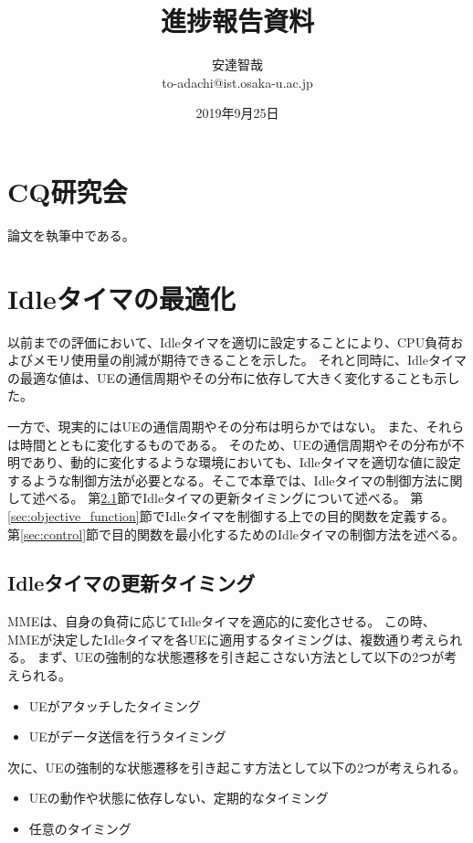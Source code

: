 \documentclass[a4j]{ujarticle}
\title{進捗報告資料}
\author{安達智哉\\to-adachi@ist.osaka-u.ac.jp}
\date{2019年9月25日}
\begin{document}
\maketitle

\section{CQ研究会}
論文を執筆中である。


\section{Idleタイマの最適化}
以前までの評価において、Idleタイマを適切に設定することにより、CPU負荷およびメモリ使用量の削減が期待できることを示した。
それと同時に、Idleタイマの最適な値は、UEの通信周期やその分布に依存して大きく変化することも示した。

一方で、現実的にはUEの通信周期やその分布は明らかではない。
また、それらは時間とともに変化するものである。
そのため、UEの通信周期やその分布が不明であり、動的に変化するような環境においても、Idleタイマを適切な値に設定するような制御方法が必要となる。そこで本章では、Idleタイマの制御方法に関して述べる。
第\ref{sec:IdleTimer_setting}節でIdleタイマの更新タイミングについて述べる。
第\ref{sec:objective_function}節でIdleタイマを制御する上での目的関数を定義する。
第\ref{sec:control}節で目的関数を最小化するためのIdleタイマの制御方法を述べる。
\subsection{Idleタイマの更新タイミング}
\label{sec:IdleTimer_setting}
MMEは、自身の負荷に応じてIdleタイマを適応的に変化させる。
この時、MMEが決定したIdleタイマを各UEに適用するタイミングは、複数通り考えられる。
まず、UEの強制的な状態遷移を引き起こさない方法として以下の2つが考えられる。
\begin{itemize}
  \item UEがアタッチしたタイミング
  \item UEがデータ送信を行うタイミング
\end{itemize}
次に、UEの強制的な状態遷移を引き起こす方法として以下の2つが考えられる。
\begin{itemize}
\item UEの動作や状態に依存しない、定期的なタイミング
\item 任意のタイミング
\end{itemize}
\end{document}
